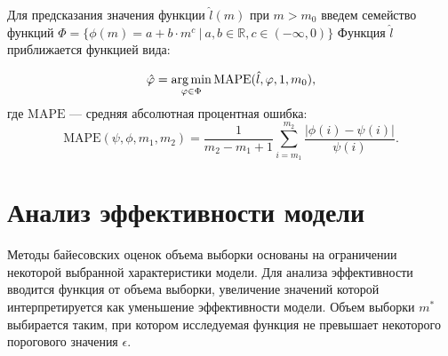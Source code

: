 \documentclass[12pt,twoside]{article}
\begin{document}
Для предсказания значения функции $\hat{l}(m)$ при $m > m_0$ введем семейство функций $\Phi = \{\phi(m) =  a + b\cdot m^c ~|~ a, b \in \mathbb{R}, c \in (-\infty, 0)\}$
Функция $\hat{l}$ приближается функцией вида:

\begin{equation}\label{argmin_MAPE}
\hat{\phi} =  \argmin_{\phi \in \Phi}\text{MAPE}(\hat{l}, \phi, 1, m_0),
\end{equation}
где $\text{MAPE}$ --- средняя абсолютная процентная ошибка:
\begin{equation}\label{MAPE}
\text{MAPE}(\psi, \phi, m_1, m_2) = \frac{1}{m_2 - m_1 + 1}\sum_{i=m_1}^{m_2}\frac{|\phi(i) - \psi(i)|}{\psi(i)}.
\end{equation}












\section{Анализ эффективности модели}

Методы байесовских оценок объема выборки основаны на ограничении некоторой выбранной характеристики модели. Для анализа эффективности вводится функция от объема выборки, увеличение значений которой интерпретируется как уменьшение эффективности модели. Объем выборки $m^{*}$ выбирается таким, при котором исследуемая функция не превышает некоторого порогового значения $\epsilon$.
\end{document}
